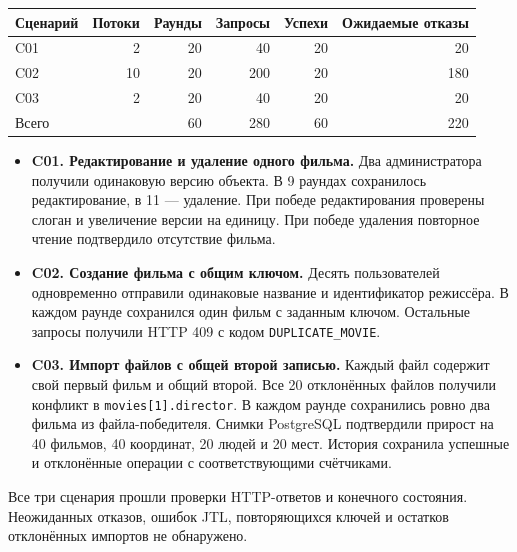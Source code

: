 \begin{center}
\begin{tabular}{lrrrrr}
\toprule
Сценарий & Потоки & Раунды & Запросы & Успехи & Ожидаемые отказы \\
\midrule
C01 & 2 & 20 & 40 & 20 & 20 \\
C02 & 10 & 20 & 200 & 20 & 180 \\
C03 & 2 & 20 & 40 & 20 & 20 \\
\midrule
Всего & & 60 & 280 & 60 & 220 \\
\bottomrule
\end{tabular}
\end{center}

\begin{itemize}
\item \textbf{C01. Редактирование и удаление одного фильма.}
Два администратора получили одинаковую версию объекта. В 9 раундах сохранилось редактирование, в 11 --- удаление. При победе редактирования проверены слоган и увеличение версии на единицу. При победе удаления повторное чтение подтвердило отсутствие фильма.
\item \textbf{C02. Создание фильма с общим ключом.}
Десять пользователей одновременно отправили одинаковые название и идентификатор режиссёра. В каждом раунде сохранился один фильм с заданным ключом. Остальные запросы получили HTTP 409 с кодом \texttt{DUPLICATE\_MOVIE}.
\item \textbf{C03. Импорт файлов с общей второй записью.}
Каждый файл содержит свой первый фильм и общий второй. Все 20 отклонённых файлов получили конфликт в \mbox{\texttt{movies[1].director}}. В каждом раунде сохранились ровно два фильма из файла-победителя. Снимки PostgreSQL подтвердили прирост на 40 фильмов, 40 координат, 20 людей и 20 мест. История сохранила успешные и отклонённые операции с соответствующими счётчиками.
\end{itemize}

Все три сценария прошли проверки HTTP-ответов и конечного состояния. Неожиданных отказов, ошибок JTL, повторяющихся ключей и остатков отклонённых импортов не обнаружено.
